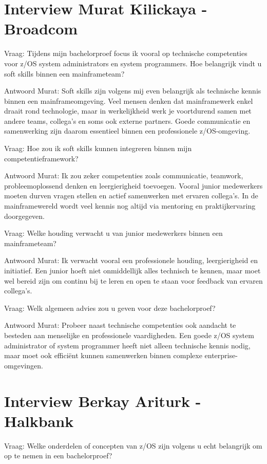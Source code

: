 \section{Interview Murat Kilickaya - Broadcom}

Vraag: Tijdens mijn bachelorproef focus ik vooral op technische competenties voor z/OS system administrators en system programmers. Hoe belangrijk vindt u soft skills binnen een mainframeteam?

Antwoord Murat: Soft skills zijn volgens mij even belangrijk als technische kennis binnen een mainframeomgeving. Veel mensen denken dat mainframewerk enkel draait rond technologie, maar in werkelijkheid werk je voortdurend samen met andere teams, collega’s en soms ook externe partners. Goede communicatie en samenwerking zijn daarom essentieel binnen een professionele z/OS-omgeving.

Vraag: Hoe zou ik soft skills kunnen integreren binnen mijn competentieframework?

Antwoord Murat: Ik zou zeker competenties zoals communicatie, teamwork, probleemoplossend denken en leergierigheid toevoegen. Vooral junior medewerkers moeten durven vragen stellen en actief samenwerken met ervaren collega’s. In de mainframewereld wordt veel kennis nog altijd via mentoring en praktijkervaring doorgegeven.

Vraag: Welke houding verwacht u van junior medewerkers binnen een mainframeteam?

Antwoord Murat: Ik verwacht vooral een professionele houding, leergierigheid en initiatief. Een junior hoeft niet onmiddellijk alles technisch te kennen, maar moet wel bereid zijn om continu bij te leren en open te staan voor feedback van ervaren collega’s.

Vraag: Welk algemeen advies zou u geven voor deze bachelorproef?

Antwoord Murat: Probeer naast technische competenties ook aandacht te besteden aan menselijke en professionele vaardigheden. Een goede z/OS system administrator of system programmer heeft niet alleen technische kennis nodig, maar moet ook efficiënt kunnen samenwerken binnen complexe enterprise-omgevingen.

\section{Interview Berkay Ariturk - Halkbank}

Vraag: Welke onderdelen of concepten van z/OS zijn volgens u echt belangrijk om op te nemen in een bachelorproef?

